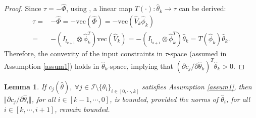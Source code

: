\documentclass[lettersize,journal]{IEEEtran}
\newtheorem{assum}{Assumption}
\newtheorem{lem}{Lemma}
\begin{document}

\begin{proof}

Since $\tau = -\hat\Phi$, using \cite[Proposition 7.1.9]{RN17}, a linear map $T(\cdot):\hat\theta_k\to\tau$ can be derived: 
\begin{equation}\label{eq linear map}
    \begin{aligned}
    \tau = &-\hat\Phi = -\text{vec}(\hat\Phi)     = -\text{vec}(\hat V_k \hat\phi_k) 
    \\
    = & -(I_{l_{k+1}}\otimes \hat\phi_k^T)\text{vec}(\hat V_k)
    =-(I_{l_{k+1}}\otimes \hat\phi_k^T)\hat\theta_k = T(\hat\phi_k) \hat\theta_k.
    \end{aligned}
\end{equation}
Therefore, the convexity of the input constraints in $\tau$-space (assumed in Assumption \ref{assum1}) holds in $\hat\theta_k$-space, implying
that $(\partial c_j/\partial \hat\theta_k)^T\hat\theta_k>0$.

\end{proof}


\begin{lem} 
    If $c_j(\hat\theta),\ \forall j\in\mathcal I \setminus \{\theta_i\}_{i\in[0,\cdots,k]}$ satisfies Assumption \ref{assum1}, then $\Vert\partial c_j/\partial\hat\theta_i\Vert$, for all $i\in[k-1,\cdots, 0]$, is bounded, provided the norms of $\hat\theta_i$, for all $i\in[k,\cdots, i+1]$, remain bounded.
    \label{lem2}
\end{lem}
\end{document}
